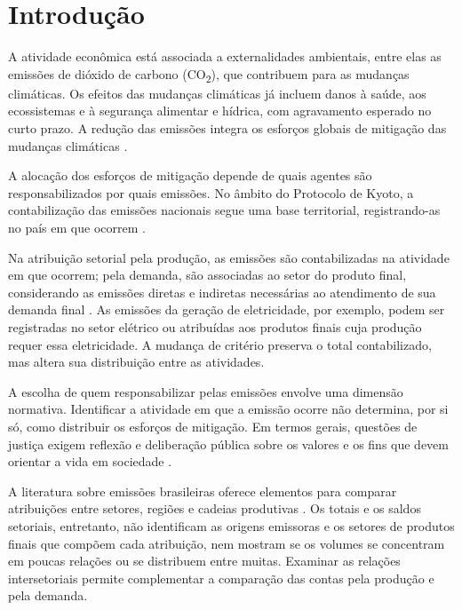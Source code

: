 \section{Introdução}

A atividade econômica está associada a externalidades ambientais, entre elas as emissões de dióxido de carbono (CO\textsubscript{2}), que contribuem para as mudanças climáticas. Os efeitos das mudanças climáticas já incluem danos à saúde, aos ecossistemas e à segurança alimentar e hídrica, com agravamento esperado no curto prazo. A redução das emissões integra os esforços globais de mitigação das mudanças climáticas \parencite{ipcc2023spm}.

A alocação dos esforços de mitigação depende de quais agentes são responsabilizados por quais emissões. No âmbito do Protocolo de Kyoto, a contabilização das emissões nacionais segue uma base territorial, registrando-as no país em que ocorrem \parencite{unfccc2008kyotoManual}.

Na atribuição setorial pela produção, as emissões são contabilizadas na atividade em que ocorrem; pela demanda, são associadas ao setor do produto final, considerando as emissões diretas e indiretas necessárias ao atendimento de sua demanda final \parencite{marques2012,millerBlair2009}. As emissões da geração de eletricidade, por exemplo, podem ser registradas no setor elétrico ou atribuídas aos produtos finais cuja produção requer essa eletricidade. A mudança de critério preserva o total contabilizado, mas altera sua distribuição entre as atividades.

A escolha de quem responsabilizar pelas emissões envolve uma dimensão normativa. Identificar a atividade em que a emissão ocorre não determina, por si só, como distribuir os esforços de mitigação. Em termos gerais, questões de justiça exigem reflexão e deliberação pública sobre os valores e os fins que devem orientar a vida em sociedade \parencite{sandel2015justica}.

A literatura sobre emissões brasileiras oferece elementos para comparar atribuições entre setores, regiões e cadeias produtivas \parencite{imori2015,sanguinetAzzoni2024,montoyaEtAl2026}. Os totais e os saldos setoriais, entretanto, não identificam as origens emissoras e os setores de produtos finais que compõem cada atribuição, nem mostram se os volumes se concentram em poucas relações ou se distribuem entre muitas. Examinar as relações intersetoriais permite complementar a comparação das contas pela produção e pela demanda.

